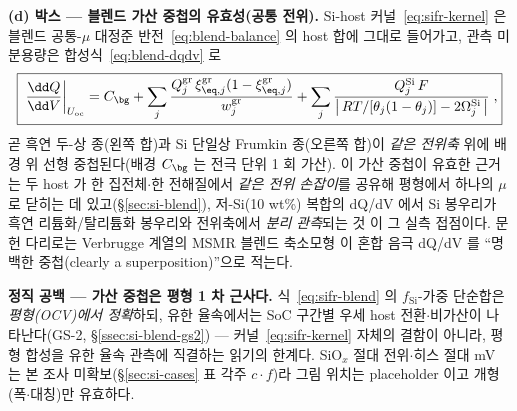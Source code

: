 \textbf{(d) 박스 --- 블렌드 가산 중첩의 유효성(공통 전위).}
Si-host 커널~\eqref{eq:sifr-kernel} 은 블렌드 공통-$\mu$ 대정준 반전~\eqref{eq:blend-balance} 의
host 합에 그대로 들어가고, 관측 미분용량은 합성식~\eqref{eq:blend-dqdv} 로
\begin{equation}
\boxed{\;\frac{\dd Q}{\dd V}\bigg|_{U_\mathrm{oc}}
=C_\bg+\sum_{j}\frac{Q_j^\mathrm{gr}\,\xi^\mathrm{gr}_{\eq,j}(1-\xi^\mathrm{gr}_{\eq,j})}{w_j^\mathrm{gr}}
+\sum_{j}\frac{Q_j^\mathrm{Si}\,F}{\big|\,RT/[\theta_j(1-\theta_j)]-2\Omega_j^\mathrm{Si}\,\big|}\;,}
\label{eq:sifr-blend}
\end{equation}
곧 흑연 두-상 종(왼쪽 합)과 Si 단일상 Frumkin 종(오른쪽 합)이 \emph{같은 전위축} 위에 배경 위 선형
중첩된다(배경 $C_\bg$ 는 전극 단위 1 회 가산). 이 가산 중첩이 유효한 근거는 두 host 가 한 집전체$\cdot$한
전해질에서 \emph{같은 전위 손잡이}를 공유해 평형에서 하나의 $\mu$ 로 닫히는 데 있고(\S\ref{sec:si-blend}),
저-Si(10 wt\%) 복합의 dQ/dV 에서 Si 봉우리가 흑연 리튬화/탈리튬화 봉우리와 전위축에서 \emph{분리
관측}되는 것\cite{naboka_sic2021} 이 그 실측 접점이다. 문헌 다리로는 Verbrugge 계열의 MSMR 블렌드
축소모형\cite{tu_blend2024,verbrugge2017} 이 혼합 음극 dQ/dV 를 ``명백한 중첩(clearly a superposition)''으로
적는다.
\begin{warnbox}
\textbf{정직 공백 --- 가산 중첩은 평형 1 차 근사다.} 식~\eqref{eq:sifr-blend} 의 $f_\mathrm{Si}$-가중 단순합은
\emph{평형(OCV)에서 정확}하되, 유한 율속에서는 SoC 구간별 우세 host 전환$\cdot$비가산이 나타난다(GS-2,
\S\ref{ssec:si-blend-gs2}) --- 커널~\eqref{eq:sifr-kernel} 자체의 결함이 아니라, 평형 합성을 유한 율속
관측에 직결하는 읽기의 한계다. SiO$_x$ 절대 전위$\cdot$히스 절대 mV 는 본 조사 미확보(\S\ref{sec:si-cases}
표 각주 $c\cdot f$)라 그림 위치는 placeholder 이고 개형(폭$\cdot$대칭)만 유효하다.
\end{warnbox}

